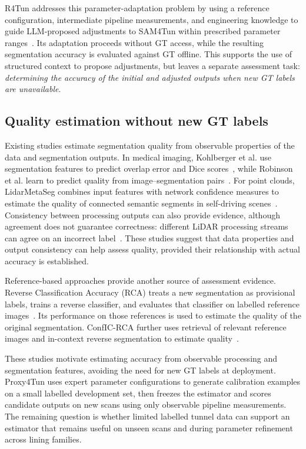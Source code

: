 \documentclass[a4paper,fleqn]{cas-dc}
\begin{document}
{R4Tun addresses this parameter-adaptation problem by using a reference configuration, intermediate pipeline measurements, and engineering knowledge to guide LLM-proposed adjustments to SAM4Tun within prescribed parameter ranges~\cite{taoR4Tun}. Its adaptation proceeds without GT access, while the resulting segmentation accuracy is evaluated against GT offline. This supports the use of structured context to propose adjustments, but leaves a separate assessment task: \textit{determining the accuracy of the initial and adjusted outputs when new GT labels are unavailable}.

\subsection{Quality estimation without new GT labels}

Existing studies estimate segmentation quality from observable properties of the data and segmentation outputs. In medical imaging, Kohlberger et al. use segmentation features to predict overlap error and Dice scores~\cite{kohlberger2012evaluating}, while Robinson et al. learn to predict quality from image--segmentation pairs~\cite{robinson2018segmentationQuality}. For point clouds, LidarMetaSeg combines input features with network confidence measures to estimate the quality of connected semantic segments in self-driving scenes~\cite{colling2021lidarmetaseg}. Consistency between processing outputs can also provide evidence, although agreement does not guarantee correctness: different LiDAR processing streams can agree on an incorrect label~\cite{bogdoll2025labelfree}. These studies suggest that data properties and output consistency can help assess quality, provided their relationship with actual accuracy is established.

Reference-based approaches provide another source of assessment evidence. Reverse Classification Accuracy (RCA) treats a new segmentation as provisional labels, trains a reverse classifier, and evaluates that classifier on labelled reference images~\cite{valindria2017rca}. Its performance on those references is used to estimate the quality of the original segmentation. ConfIC-RCA further uses retrieval of relevant reference images and in-context reverse segmentation to estimate quality~\cite{cosarinsky2026conficrca}.

These studies motivate estimating accuracy from observable processing and segmentation features, avoiding the need for new GT labels at deployment. Proxy4Tun uses expert parameter configurations to generate calibration examples on a small labelled development set, then freezes the estimator and scores candidate outputs on new scans using only observable pipeline measurements. The remaining question is whether limited labelled tunnel data can support an estimator that remains useful on unseen scans and during parameter refinement across lining families.

}
\end{document}
